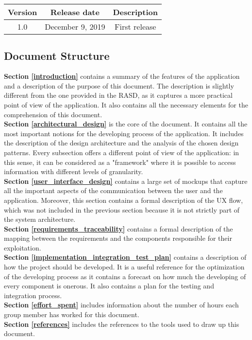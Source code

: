 \documentclass[./main.tex]{subfiles}
\begin{document}
\begin{table}[H]
\centering
\begin{tabular}{|c|c|c|}
\hline
Version & Release date & Description\tabularnewline
\hline
1.0 & December 9, 2019 & First release\tabularnewline
\hline
\end{tabular}
\end{table}

\subsection{Document Structure}

\textbf{Section \ref{introduction}} contains a summary of the features of the
application and a description of the purpose of this document. The description
is slightly different from the one provided in the RASD, as it captures a more
practical point of view of the application. It also contains all the necessary
elements for the comprehension of this document.
\medskip\\
\textbf{Section \ref{architectural_design}} is the core of the document. It
contains all the most important notions for the developing process of the
application. It includes the description of the design architecture and the
analysis of the chosen design patterns. Every subsection offers a different
point of view of the application: in this sense, it can be considered as a
"framework" where it is possible to access information with different levels of
granularity.
\medskip\\
\textbf{Section \ref{user_interface_design}} contains a large set of mockups
that capture all the important aspects of the communication between the user
and the application. Moreover, this section contains a formal description of
the UX flow, which was not included in the previous section because it is not
strictly part of the system architecture.
\medskip\\
\textbf{Section \ref{requirements_traceability}} contains a formal description
of the mapping between the requirements and the components responsible for
their exploitation.
\medskip\\
\textbf{Section \ref{implementation_integration_test_plan}} contains a
description of how the project should be developed. It is a useful reference
for the optimization of the developing process as it contains a forecast on how
much the developing of every component is onerous. It also contains a plan for
the testing and integration process.
\medskip\\
\textbf{Section \ref{effort_spent}} includes information about the number of
hours each group member has worked for this document.
\medskip\\
\textbf{Section \ref{references}} includes the references to the tools used to
draw up this document.
\end{document}
